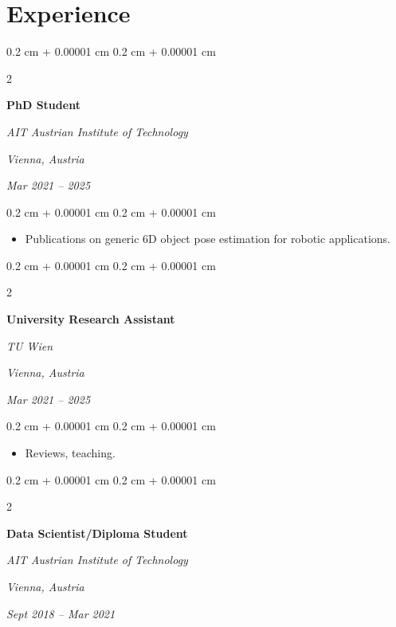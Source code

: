 \documentclass[10pt, letterpaper]{article}
\newenvironment{highlights}{
    \begin{itemize}[
        topsep=0.10 cm,
        parsep=0.10 cm,
        partopsep=0pt,
        itemsep=0pt,
        leftmargin=0.4 cm + 10pt
    ]
}{
    \end{itemize}
} %
\newenvironment{onecolentry}{
    \begin{adjustwidth}{
        0.2 cm + 0.00001 cm
    }{
        0.2 cm + 0.00001 cm
    }
}{
    \end{adjustwidth}
} %
\newenvironment{twocolentry}[2][]{
    \onecolentry
    \def\secondColumn{#2}
    \setcolumnwidth{\fill, 4.5 cm}
    \begin{paracol}{2}
}{
    \switchcolumn \raggedleft \secondColumn
    \end{paracol}
    \endonecolentry
} %
\begin{document}
    
    \section{Experience}



        
        \begin{twocolentry}{
        \textit{Vienna, Austria}    
            
        \textit{Mar 2021 – 2025}}
            \textbf{PhD Student}
            
            \textit{AIT Austrian Institute of Technology}
        \end{twocolentry}

        \vspace{0.10 cm}
        \begin{onecolentry}
            \begin{highlights}
                \item Publications on generic 6D object pose estimation for robotic applications.
            \end{highlights}
        \end{onecolentry}


        \vspace{0.2 cm}

        \begin{twocolentry}{
        \textit{Vienna, Austria}    
            
        \textit{Mar 2021 – 2025}}
            \textbf{University Research Assistant}
            
            \textit{TU Wien}
        \end{twocolentry}

        \vspace{0.10 cm}
        \begin{onecolentry}
            \begin{highlights}
                \item Reviews, teaching.
            \end{highlights}
        \end{onecolentry}


        \vspace{0.2 cm}

        \begin{twocolentry}{
        \textit{Vienna, Austria}    
            
        \textit{Sept 2018 – Mar 2021}}
            \textbf{Data Scientist/Diploma Student}
            
            \textit{AIT Austrian Institute of Technology}
        \end{twocolentry}
\end{document}
